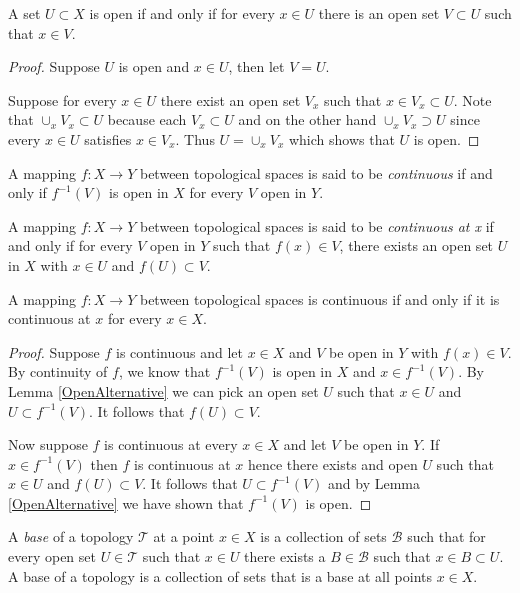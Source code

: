 \begin{lem}\label{OpenAlternative}A set $U \subset X$ is open if and only if for every $x \in
  U$ there is an open set $V \subset U$ such that $x \in V$.
\end{lem}
\begin{proof}
Suppose $U$ is open and $x \in U$, then let $V = U$.

Suppose for every $x \in U$ there exist an open set $V_x$ such that $x
\in V_x \subset U$.  Note that $\cup_x V_x \subset U$ because each
$V_x \subset U$ and on the other hand $\cup_x V_x \supset U$ since
every $x \in U$ satisfies $x \in V_x$.  Thus $U = \cup_x V_x$ which
shows that $U$ is open.
\end{proof}
\begin{defn}A mapping $f : X \to Y$ between topological spaces is said
  to be \emph{continuous} if and only if $f^{-1}(V)$ is open in $X$
  for every $V$ open in $Y$.
\end{defn}
\begin{defn}A mapping $f : X \to Y$ between topological spaces is said
  to be \emph{continuous at x} if and only if for every $V$ open in
  $Y$ such that $f(x) \in V$, there exists an open set $U$ in $X$ with $x \in U$ and $f(U)
  \subset V$.
\end{defn}
\begin{lem}A mapping $f : X \to Y$ between topological spaces is
  continuous if and only if it is continuous at $x$ for every $x \in X$.
\end{lem}
\begin{proof}
Suppose $f$ is continuous and let $x \in X$ and $V$ be open in $Y$
with $f(x) \in V$.  By continuity of $f$, we know that $f^{-1}(V)$ is
open in $X$ and $x \in f^{-1}(V)$.  By Lemma \ref{OpenAlternative} we
can pick an open set $U$ such that $x \in U$ and $U \subset
f^{-1}(V)$.  It follows that $f(U) \subset V$.

Now suppose $f$ is continuous at every $x \in X$ and let $V$ be open
in $Y$.  If $x \in f^{-1}(V)$ then $f$ is continuous at $x$ hence
there exists and open $U$ such that $x \in U$ and $f(U) \subset V$.
It follows that $U \subset f^{-1}(V)$ and by Lemma
\ref{OpenAlternative}  we have shown that $f^{-1}(V)$ is open.
\end{proof}

\begin{defn}A \emph{base} of a topology $\mathcal{T}$ at a point $x
  \in X$ is a collection
  of sets $\mathcal{B}$ such that for every open set $U \in
  \mathcal{T}$ such that $x \in U$ there exists a $B \in \mathcal{B}$ such
  that $x \in B \subset U$.  A base of a topology is a collection of
  sets that is a base at all points $x \in X$.
\end{defn}

